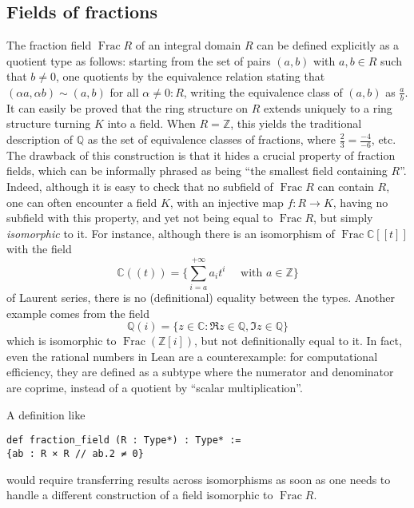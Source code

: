 \documentclass[a4paper,USenglish,cleveref, autoref, thm-restate]{lipics-v2021}
\newcommand{\C}{\mathbb{C}}
\newcommand{\Q}{\mathbb{Q}}
\newcommand{\Z}{\mathbb{Z}}
\DeclareMathOperator{\Frac}{Frac}
\begin{document}
\subsection{Fields of fractions}\label{subsection : fields of fractions}
The fraction field $\Frac R$ of an integral domain $R$ can be defined explicitly as a quotient type as follows:
starting from the set of pairs $(a,b)$ with $a,b \in R$ such that $b\neq 0$,
one quotients by the equivalence relation stating that $(\alpha a, \alpha b) \sim (a,b)$ for all $\alpha \ne 0 : R$, writing the equivalence class of $(a,b)$ as $\frac{a}{b}$.
It can easily be proved that the ring structure on $R$ extends uniquely to a ring structure turning $K$ into a field.
When $R=\Z$, this yields the traditional description of $\Q$ as the set of equivalence classes of fractions, where $\frac{2}{3}=\frac{-4}{-6}$, etc.
The drawback of this construction is that it hides a crucial property of fraction fields, which can be informally phrased as being ``the smallest field containing $R$''.
Indeed, although it is easy to check that no subfield of $\Frac R$ can contain $R$, one can often encounter a field $K$, with an injective map $f\colon R\to K$, having no subfield with this property, and yet not being equal to $\Frac R$, but simply \emph{isomorphic} to it. For instance, although there is an isomorphism of $\Frac \C[\![t]\!]$ with the field
\[
\C(\!(t)\!)=\big\{\sum_{i=a}^{+\infty} a_it^i\quad\text{ with }a \in \Z\big\}
\]
of Laurent series, there is no (definitional) equality between the types. Another example comes from the field
\[
\Q(i)=\{z \in \C : \Re z \in \Q, \Im z\in\Q\}
\]
which is isomorphic to $\Frac (\Z[i])$, but not definitionally equal to it.
In fact, even the rational numbers in Lean are a counterexample:
for computational efficiency, they are defined as a subtype where the numerator and denominator are coprime,
instead of a quotient by ``scalar multiplication''.

A definition like
\begin{lstlisting}
def fraction_field (R : Type*) : Type* :=
{ab : R × R // ab.2 ≠ 0}
\end{lstlisting}
would require transferring results across isomorphisms as soon as one needs to handle a different construction of a field isomorphic to $\Frac R$.
\end{document}
